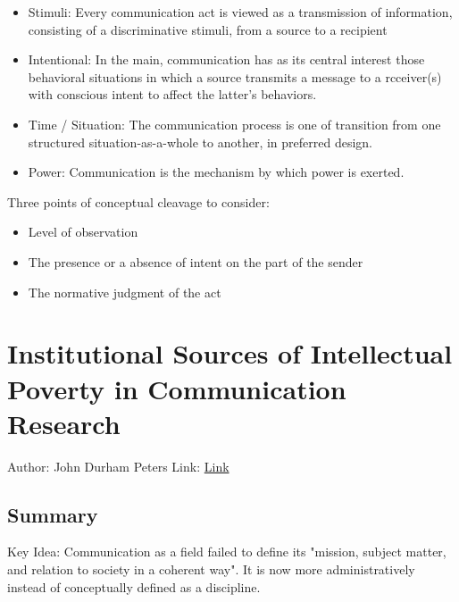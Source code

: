 \begin{itemize}
        \item Stimuli: Every communication act is viewed as a transmission of information, consisting of a discriminative stimuli, from a source to a recipient
        \item Intentional: In the main, communication has as its central interest those behavioral situations in which a source transmits a message to a rcceiver(s) with conscious intent to affect the latter’s behaviors.
        \item Time / Situation: The communication process is one of transition from one structured situation-as-a-whole to another, in preferred design.
        \item Power: Communication is the mechanism by which power is exerted. 
    \end{itemize}
Three points of conceptual cleavage to consider: 
    \begin{itemize}
        \item Level of observation 
        \item The presence or a absence of intent on the part of the sender 
        \item The normative judgment of the act 
    \end{itemize}
    



\section{Institutional Sources of Intellectual Poverty in Communication Research}
Author: John Durham Peters
Link: \href{https://journals.sagepub.com/doi/10.1177/009365086013004002}{Link}
\subsection{Summary}
Key Idea: Communication as a field failed to define its "mission, subject matter, and relation to society in a coherent way". It is now more administratively instead of conceptually defined as a discipline. 

